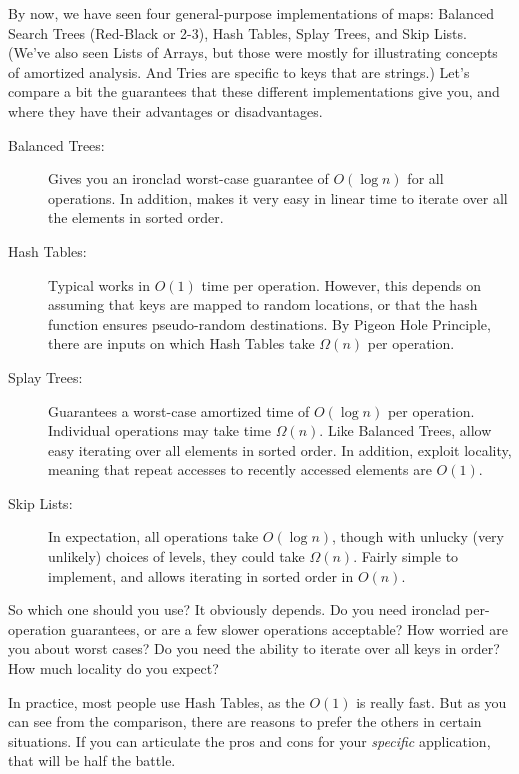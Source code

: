 By now, we have seen four general-purpose implementations of maps:
Balanced Search Trees (Red-Black or 2-3), Hash Tables, Splay Trees,
and Skip Lists. (We've also seen Lists of Arrays, but those were
mostly for illustrating concepts of amortized analysis. 
And Tries are specific to keys that are strings.)
Let's compare a bit the guarantees that these different
implementations give you, and where they have their advantages or
disadvantages.

\begin{description}
\item[Balanced Trees:] Gives you an ironclad worst-case guarantee of
  $O(\log n)$ for all operations. In addition, makes it very easy in
  linear time to iterate over all the elements in sorted order.
\item[Hash Tables:] Typical works in $O(1)$ time per
  operation. However, this depends on assuming that keys are mapped to
  random locations, or that the hash function ensures pseudo-random
  destinations. By Pigeon Hole Principle, there are inputs on which
  Hash Tables take $\Omega(n)$ per operation.
\item[Splay Trees:] Guarantees a worst-case amortized time of $O(\log
  n)$ per operation. Individual operations may take time
  $\Omega(n)$. Like Balanced Trees, allow easy iterating over all
  elements in sorted order. In addition, exploit locality, meaning
  that repeat accesses to recently accessed elements are $O(1)$.
\item[Skip Lists:] In expectation, all operations take $O(\log n)$,
  though with unlucky (very unlikely) choices of levels, they could take
  $\Omega(n)$. Fairly simple to implement, and allows iterating in
  sorted order in $O(n)$.
\end{description}

So which one should you use? It obviously depends. Do you need
ironclad per-operation guarantees, or are a few slower operations
acceptable? How worried are you about worst cases? Do you need the
ability to iterate over all keys in order? How much locality do you
expect?

In practice, most people use Hash Tables, as the $O(1)$ is really
fast. But as you can see from the comparison, there are reasons to
prefer the others in certain situations. If you can articulate the
pros and cons for your \emph{specific} application, that will be half
the battle. 